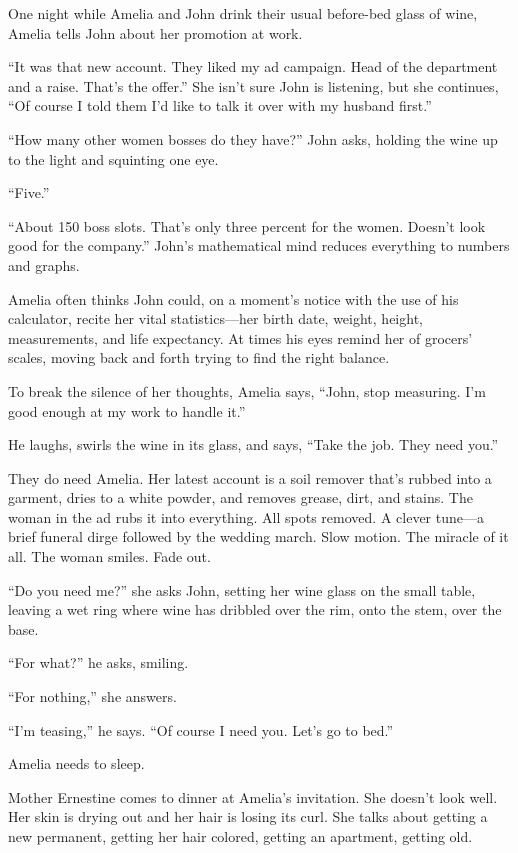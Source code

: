 \documentclass[
]{article}
\begin{document}
One night while Amelia and John drink their usual before-bed glass of
wine, Amelia tells John about her promotion at work.

``It was that new account. They liked my ad campaign. Head of the
department and a raise. That's the offer.'' She isn't sure John is
listening, but she continues, ``Of course I told them I'd like to talk
it over with my husband first.''

``How many other women bosses do they have?'' John asks, holding the
wine up to the light and squinting one eye.

``Five.''

``About 150 boss slots. That's only three percent for the women. Doesn't
look good for the company.'' John's mathematical mind reduces everything
to numbers and graphs.

Amelia often thinks John could, on a moment's notice with the use of his
calculator, recite her vital statistics---her birth date, weight,
height, measurements, and life expectancy. At times his eyes remind her
of grocers' scales, moving back and forth trying to find the right
balance.

To break the silence of her thoughts, Amelia says, ``John, stop
measuring. I'm good enough at my work to handle it.''

He laughs, swirls the wine in its glass, and says, ``Take the job. They
need you.''

They do need Amelia. Her latest account is a soil remover that's rubbed
into a garment, dries to a white powder, and removes grease, dirt, and
stains. The woman in the ad rubs it into everything. All spots removed.
A clever tune---a brief funeral dirge followed by the wedding march.
Slow motion. The miracle of it all. The woman smiles. Fade out.

``Do you need me?'' she asks John, setting her wine glass on the small
table, leaving a wet ring where wine has dribbled over the rim, onto the
stem, over the base.

``For what?'' he asks, smiling.

``For nothing,'' she answers.

``I'm teasing,'' he says. ``Of course I need you. Let's go to bed.''

Amelia needs to sleep.

Mother Ernestine comes to dinner at Amelia's invitation. She doesn't
look well. Her skin is drying out and her hair is losing its curl. She
talks about getting a new permanent, getting her hair colored, getting
an apartment, getting old.
\end{document}
